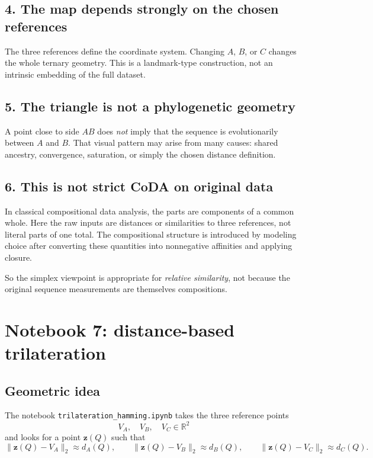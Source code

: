 \documentclass[11pt,a4paper]{article}
\begin{document}
\subsection{4. The map depends strongly on the chosen references}

The three references define the coordinate system. Changing $A$, $B$, or $C$ changes the whole ternary geometry. This is a landmark-type construction, not an intrinsic embedding of the full dataset.

\subsection{5. The triangle is not a phylogenetic geometry}

A point close to side $AB$ does \emph{not} imply that the sequence is evolutionarily between $A$ and $B$. That visual pattern may arise from many causes: shared ancestry, convergence, saturation, or simply the chosen distance definition.

\subsection{6. This is not strict CoDA on original data}

In classical compositional data analysis, the parts are components of a common whole. Here the raw inputs are distances or similarities to three references, not literal parts of one total. The compositional structure is introduced by modeling choice after converting these quantities into nonnegative affinities and applying closure.

So the simplex viewpoint is appropriate for \emph{relative similarity}, not because the original sequence measurements are themselves compositions.

\section{Notebook 7: distance-based trilateration}

\subsection{Geometric idea}

The notebook \texttt{trilateration\_hamming.ipynb} takes the three reference points
\[
V_A,\quad V_B,\quad V_C\in\mathbb{R}^2
\]
and looks for a point $\bm{z}(Q)$ such that
\[
\|\bm{z}(Q)-V_A\|_2\approx d_A(Q),\qquad
\|\bm{z}(Q)-V_B\|_2\approx d_B(Q),\qquad
\|\bm{z}(Q)-V_C\|_2\approx d_C(Q).
\]
\end{document}
